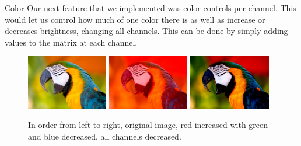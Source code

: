 \documentclass{beamer}
\begin{document}
\begin{frame}{Color}
Our next feature that we implemented was color controls per channel. This would let us control how much of one color there is as well as increase or decreases brightness, changing all channels. This can be done by simply adding values to the matrix at each channel.

\begin{figure}[ht]
\includegraphics[width=1.4in]{parrot.jpg}
\hspace{.1in} 
\includegraphics[width=1.4in]{parrotout1.jpg}
\hspace{.1in}
\includegraphics[width=1.4in]{parrotout2.jpg}
\hspace{.1in}
\caption{In order from left to right, original image, red increased with green and blue decreased, all channels decreased.}
\end{figure}

\end{frame}
\end{document}
